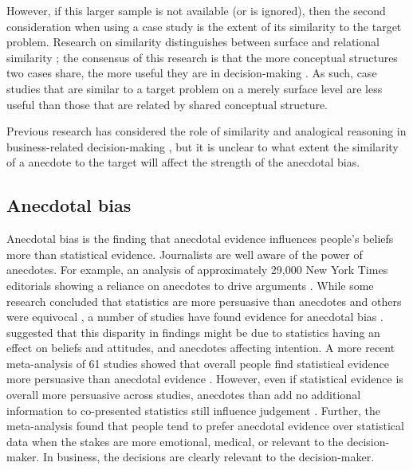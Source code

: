 \documentclass[a4paper, nobind, dvipsnames]{templates/ociamthesis}
\theoremstyle{definition}
\theoremstyle{definition}
\theoremstyle{definition}
\theoremstyle{definition}
\theoremstyle{remark}
\begin{document}
However, if this larger sample is not available (or is ignored), then the second
consideration when using a case study is the extent of its similarity to the
target problem. Research on similarity distinguishes between surface and
relational similarity \autocite{gentner1983}; the consensus of this research is that the
more conceptual structures two cases share, the more useful they are in
decision-making \autocite{markman1995,lassaline1996}. As such, case studies that are
similar to a target problem on a merely surface level are less useful than those
that are related by shared conceptual structure.

Previous research has considered the role of similarity and analogical reasoning
in business-related decision-making \autocite{gavetti2005}, but it is unclear to what
extent the similarity of a anecdote to the target will affect the strength of
the anecdotal bias.

\subsection{Anecdotal bias}

Anecdotal bias is the finding that anecdotal evidence influences people's
beliefs more than statistical evidence. Journalists are well aware of the power
of anecdotes. For example, an analysis of approximately 29,000 New York Times
editorials showing a reliance on anecdotes to drive arguments \autocite{alkhatib2017}.
While some research concluded that statistics are more persuasive than anecdotes
\autocites[e.g.,][]{allen1997,hornikx2005,hoeken2001} and others were equivocal
\autocite{winterbottom2008}, a number of studies have found evidence for anecdotal bias
\autocites[e.g.,][]{reinard1988,shen2015,jaramillo2019,ratcliff2020,reinhart2006}.
\textcite{zebregs2015} suggested that this disparity in findings might be due to
statistics having an effect on beliefs and attitudes, and anecdotes affecting
intention. A more recent meta-analysis of 61 studies showed that overall people
find statistical evidence more persuasive than anecdotal evidence
\autocite{freling2020}. However, even if statistical evidence is overall more persuasive
across studies, anecdotes than add no additional information to co-presented
statistics still influence judgement \autocite{jaramillo2019}. Further, the
meta-analysis found that people tend to prefer anecdotal evidence over
statistical data when the stakes are more emotional, medical, or relevant to the
decision-maker. In business, the decisions are clearly relevant to the
decision-maker.
\end{document}
